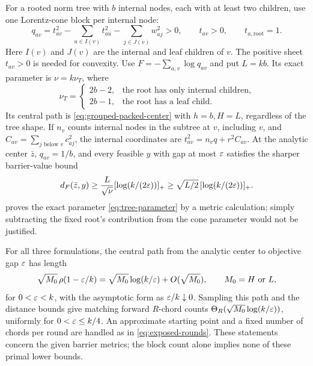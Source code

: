 For a rooted norm tree with $b$ internal nodes, each with at least two
children, use one Lorentz-cone block per internal node:
\begin{equation}
 q_{av}=t_{av}^2-\sum_{u\in I(v)}t_{au}^2
                    -\sum_{j\in J(v)}w_{aj}^2>0,
 \qquad t_{av}>0,
 \qquad t_{a,\mathrm{root}}=1.
 \label{eq:norm-tree-domain}
\end{equation}
Here $I(v)$ and $J(v)$ are the internal and leaf children of $v$.
The positive sheet $t_{av}>0$ is needed for convexity. Use $F=-\sum_{a,v}\log q_{av}$ and
put $L=kb$. Its exact parameter is $\nu=k\nu_T$, where
\begin{equation}
 \nu_T=\begin{cases}2b-2,&\text{the root has only internal children},\\
                         2b-1,&\text{the root has a leaf child}.
          \end{cases}
 \label{eq:tree-parameter}
\end{equation}
Its central path is \eqref{eq:grouped-packed-center} with $h=b,H=L$,
regardless of the tree shape. If $n_v$ counts internal
nodes in the subtree at $v$, including $v$, and $C_{av}=\sum_{j\text{ below }v}c_{aj}^2$, the
internal coordinates are $t_{av}^2=n_vq+r^2C_{av}$.
At the analytic center $\bar z$, $q_{av}=1/b$, and every feasible $y$ with gap at most
$\varepsilon$ satisfies the sharper barrier-value bound
\begin{equation}
 d_F(\bar z,y)\geq\frac{L}{\sqrt\nu}
                        [\log(k/(2\varepsilon))]_+
 \geq\sqrt{L/2}\,[\log(k/(2\varepsilon))]_+.
 \label{eq:tree-distance}
\end{equation}
 proves the exact parameter
\eqref{eq:tree-parameter} by a metric calculation; simply subtracting
the fixed root's contribution from the cone parameter would not be
justified.

For all three formulations, the central path from the analytic center
to objective gap $\varepsilon$ has length
\begin{equation}
 \sqrt{M_0}\,\rho(1-\varepsilon/k)
 =\sqrt{M_0}\log(k/\varepsilon)+O(\sqrt{M_0}),
 \qquad M_0=H\text{ or }L,
 \label{eq:formulation-route}
\end{equation}
for $0<\varepsilon<k$, with the asymptotic form as $\varepsilon/k\downarrow0$.
Sampling this path and the distance bounds give matching forward
$R$-chord counts $\Theta_R(\sqrt{M_0}\log(k/\varepsilon))$, uniformly for $0<\varepsilon\leq k/4$.
An approximate starting point and a fixed number of chords per round
are handled as in \eqref{eq:exposed-rounds}.
These statements concern the given barrier metrics; the block count
alone implies none of these primal lower bounds.
